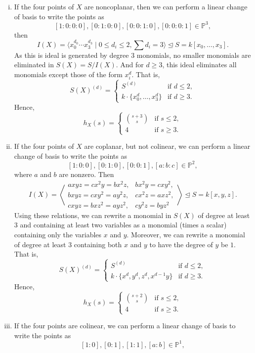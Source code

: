 \documentclass[12pt]{article}
\theoremstyle{definition}
\renewcommand{\P}{\mathbb{P}}
\newcommand{\<}{\langle}
\renewcommand{\>}{\rangle}
\newcommand{\teq}{\trianglelefteq}
\begin{document}
\begin{enumerate}[(i)]
    \item If the four points of $X$ are noncoplanar, then we can perform a linear change of basis to write the points as
    \[
        [1 : 0 : 0 : 0], [0 : 1 : 0 : 0], [0 : 0 : 1 : 0], [0 : 0 : 0 : 1] \in \P^3,
    \]
    then
    \[
        I(X) = \<x_0^{d_0} \cdots x_3^{d_3} \mid 0 \leq d_i \leq 2, \textstyle\sum d_i = 3\> \teq S = k[x_0, \dots, x_3].
    \]
    As this is ideal is generated by degree $3$ monomials, no smaller monomials are eliminated in $S(X) = S/I(X)$.
    And for $d \geq 3$, this ideal eliminates all monomials except those of the form $x_i^d$.
    That is,
    \[
        S(X)^{(d)} = \begin{cases}
            S^{(d)} & \text{if } d \leq 2, \\
            k \cdot \{x_0^d, \dots, x_3^d\} & \text{if } d \geq 3.
        \end{cases}
    \]
    Hence,
    \[
        h_X(s) = \begin{cases}
            \binom{s + 3}{s} & \text{if } s \leq 2, \\
            4 & \text{if } s \geq 3.
        \end{cases}
    \]

    \item If the four points of $X$ are coplanar, but not colinear, we can perform a linear change of basis to write the points as
    \[
        [1 : 0 : 0], [0 : 1 : 0], [0 : 0 : 1], [a : b : c] \in \P^2,
    \]
    where $a$ and $b$ are nonzero.
    Then
    \[
        I(X) = \left\<\begin{matrix}
            axyz = cx^2y = bx^2z, & bx^2y = cxy^2, \\
            bxyz = cxy^2 = ay^2z, & cx^2z = axz^2, \\
            cxyz = bxz^2 = ayz^2, & cy^2z = byz^2
        \end{matrix}\right\>
        \teq S = k[x, y, z].
    \]
    Using these relations, we can rewrite a monomial in $S(X)$ of degree at least $3$ and containing at least two variables as a monomial (times a scalar) containing only the variables $x$ and $y$.
    Moreover, we can rewrite a monomial of degree at least $3$ containing both $x$ and $y$ to have the degree of $y$ be $1$.
    That is, 
    \[
        S(X)^{(d)} = \begin{cases}
            S^{(d)} & \text{if } d \leq 2, \\
            k \cdot \{x^d, y^d, z^d, x^{d-1}y\} & \text{if } d \geq 3.
        \end{cases}
    \]
    Hence,
    \[
        h_X(s) = \begin{cases}
            \binom{s + 2}{s} & \text{if } s \leq 2, \\
            4 & \text{if } s \geq 3.
        \end{cases}
    \]

    \item If the four points are colinear, we can perform a linear change of basis to write the points as
    \[
        [1 : 0], [0 : 1], [1 : 1], [a : b] \in \P^1,
    \]
    
\end{enumerate}
\end{document}
